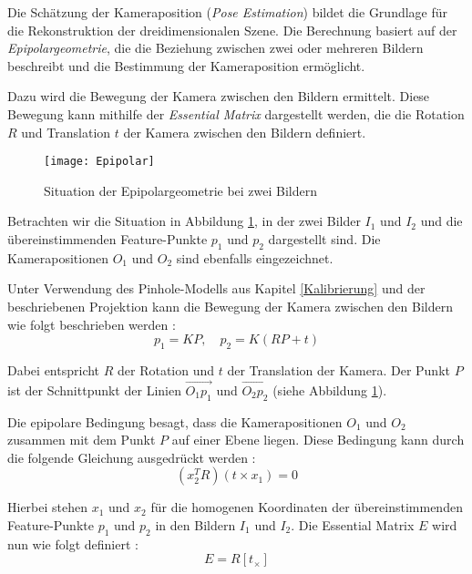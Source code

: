 Die Schätzung der Kameraposition (\emph{Pose Estimation}) bildet die Grundlage für die Rekonstruktion der dreidimensionalen Szene. Die Berechnung basiert auf der \emph{Epipolargeometrie}, die die Beziehung zwischen zwei oder mehreren Bildern beschreibt und die Bestimmung der Kameraposition ermöglicht. \cite{gao2021vSLAM} 

Dazu wird die Bewegung der Kamera zwischen den Bildern ermittelt. Diese Bewegung kann mithilfe der \emph{Essential Matrix} dargestellt werden, die die Rotation \( R \) und Translation \( t \) der Kamera zwischen den Bildern definiert. \cite{gao2021vSLAM}

\begin{figure}[ht]
    \centering
    \texttt{[image: Epipolar]}
    \caption{Situation der Epipolargeometrie bei zwei Bildern \cite{gao2021vSLAM}\label{fig:Epipolar}}\par
\end{figure}

Betrachten wir die Situation in Abbildung \ref{fig:Epipolar}, in der zwei Bilder \( I_1 \) und \( I_2 \) und die übereinstimmenden Feature-Punkte \( p_1 \) und \( p_2 \) dargestellt sind. Die Kamerapositionen \( O_1 \) und \( O_2 \) sind ebenfalls eingezeichnet. \cite{gao2021vSLAM}

Unter Verwendung des Pinhole-Modells aus Kapitel \ref{Kalibrierung} und der beschriebenen Projektion kann die Bewegung der Kamera zwischen den Bildern wie folgt beschrieben werden \cite{gao2021vSLAM}:
\begin{equation}
    p_1 = KP, \quad p_2 = K(RP + t)
\end{equation}

Dabei entspricht \( R \) der Rotation und \( t \) der Translation der Kamera. Der Punkt \( P \) ist der Schnittpunkt der Linien \( \overrightarrow{O_1p_1} \) und \( \overrightarrow{O_2p_2} \) (siehe Abbildung \ref{fig:Epipolar}). \cite{gao2021vSLAM}

Die epipolare Bedingung besagt, dass die Kamerapositionen \( O_1 \) und \( O_2 \) zusammen mit dem Punkt \( P \) auf einer Ebene liegen. Diese Bedingung kann durch die folgende Gleichung ausgedrückt werden \cite{gao2021vSLAM, kitani2017essentialMatrix}:
\begin{equation}
    (x_2^T R) (t \times x_1) = 0\label{eq:Epipolar}
\end{equation}

Hierbei stehen \( x_1 \) und \( x_2 \) für die homogenen Koordinaten der übereinstimmenden Feature-Punkte \( p_1 \) und \( p_2 \) in den Bildern \( I_1 \) und \( I_2 \). Die Essential Matrix \( E \) wird nun wie folgt definiert \cite{gao2021vSLAM, kitani2017essentialMatrix}:
\begin{equation}
    E = R [t_{\times}]
\end{equation}

